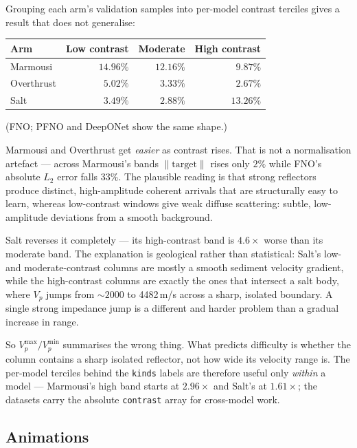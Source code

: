 \documentclass[11pt,a4paper]{article}
\begin{document}
Grouping each arm's validation samples into per-model contrast terciles gives a
result that does not generalise:

\begin{center}
\small
\begin{tabular}{lrrr}
\toprule
\textbf{Arm} & \textbf{Low contrast} & \textbf{Moderate} & \textbf{High contrast}\\
\midrule
Marmousi   & $14.96\%$ & $12.16\%$ & $\mathbf{9.87\%}$\\
Overthrust & $5.02\%$  & $3.33\%$  & $\mathbf{2.67\%}$\\
Salt       & $3.49\%$  & $2.88\%$  & $\mathbf{13.26\%}$\\
\bottomrule
\end{tabular}
\end{center}

\noindent(FNO; PFNO and DeepONet show the same shape.)

Marmousi and Overthrust get \emph{easier} as contrast rises. That is not a
normalisation artefact --- across Marmousi's bands $\|\text{target}\|$ rises
only $2\%$ while FNO's absolute $L_2$ error falls $33\%$. The plausible reading
is that strong reflectors produce distinct, high-amplitude coherent arrivals
that are structurally easy to learn, whereas low-contrast windows give weak
diffuse scattering: subtle, low-amplitude deviations from a smooth background.

Salt reverses it completely --- its high-contrast band is $4.6\times$ worse than
its moderate band. The explanation is geological rather than statistical: Salt's
low- and moderate-contrast columns are mostly a smooth sediment velocity
gradient, while the high-contrast columns are exactly the ones that intersect a
salt body, where $V_p$ jumps from ${\sim}2000$ to 4482\,m/s across a sharp,
isolated boundary. A single strong impedance jump is a different and harder
problem than a gradual increase in range.

So $V_p^{\max}/V_p^{\min}$ summarises the wrong thing. What predicts difficulty
is whether the column contains a sharp isolated reflector, not how wide its
velocity range is. The per-model terciles behind the \texttt{kinds} labels are
therefore useful only \emph{within} a model --- Marmousi's high band starts at
$2.96\times$ and Salt's at $1.61\times$; the datasets carry the absolute
\texttt{contrast} array for cross-model work.

\subsection{Animations}\label{sec:realgifs}
\end{document}
